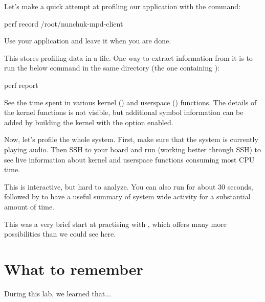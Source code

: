 Let's make a quick attempt at profiling our application with the
 command:

\begin{bashinput}
perf record /root/nunchuk-mpd-client
\end{bashinput}

Use your application and leave it when you are done.

This stores profiling data in a  file. One way to
extract information from it is to run the below command in the same
directory (the one containing ):

\begin{bashinput}
perf report
\end{bashinput}

See the time spent in various kernel (\code{[k]}) and userspace
(\code{[.]}) functions. The details of the kernel functions is not
visible, but additional symbol information can be added by building
the kernel with the  option enabled.

Now, let's profile the whole system. First, make sure that the system is
currently playing audio. Then SSH to your board and run 
(working better through SSH) to see live information about kernel and
userspace functions consuming most CPU time.

This is interactive, but hard to analyze. You can also run  for about 30 seconds, followed by  to have
a useful summary of system wide activity for a substantial amount of time.

This was a very brief start at practising with , which offers
many more possibilities than we could see here.

\section{What to remember}

During this lab, we learned that...

